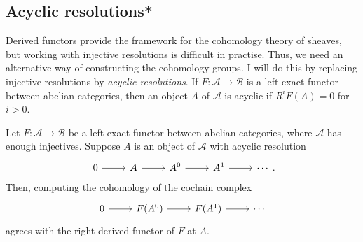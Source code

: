 \subsection{Acyclic resolutions*}
Derived functors provide the framework for the cohomology theory of
sheaves, but working with injective resolutions is difficult in practise.
Thus, we need an alternative way of constructing the cohomology groups.
I will do this by replacing injective resolutions by \emph{acyclic
  resolutions}. If $F:\mathcal{A}\to\mathcal{B}$ is a left-exact
functor between abelian categories, then an object $A$ of $\mathcal{A}$ is
acyclic if $R^{i}F(A)=0$ for $i>0$.
\begin{lemm}
  Let $F:\mathcal{A}\to\mathcal{B}$ be a left-exact functor
  between abelian categories, where $\mathcal{A}$ has enough injectives.
  Suppose $A$ is an object of $\mathcal{A}$ with acyclic resolution
  \[\begin{tikzcd}
      0\rar & A\rar & A^{0}\rar & A^{1}\rar & \cdots
    \end{tikzcd}.\]
  Then, computing the cohomology of the cochain complex
  \[\begin{tikzcd}
      0\rar & F(A^{0})\rar & F(A^{1})\rar & \cdots
    \end{tikzcd}\]
  agrees with the right derived functor of $F$ at $A$.
\end{lemm}
